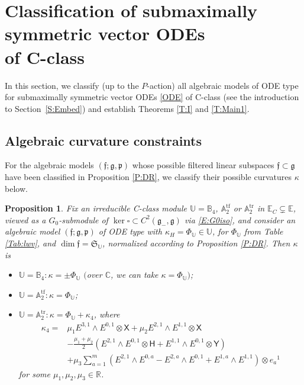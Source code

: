 \documentclass[10pt,a4paper]{amsart}
\newcommand\tensor{\otimes}
\DeclareMathOperator{\tf}{tf}
\DeclareMathOperator{\tr}{tr}
\newcommand{\g}{\mathfrak{g}}
\newcommand\ff{\mathfrak{f}}
\newcommand\fg{\mathfrak{g}}
\newcommand\fp{\mathfrak{p}}
\newcommand\fS{\mathfrak{S}}
\newcommand{\R}{\mathbb{R}}
\newcommand{\C}{\mathbb{C}}
\newcommand\bbE{\mathbb{E}}
\newcommand\bbU{\mathbb{U}}
\newcommand\bbA{\mathbb{A}}
\newcommand\bbB{\mathbb{B}}
\newcommand\sfX{\mathsf{X}}
\newcommand\sfH{\mathsf{H}}
\newcommand\sfY{\mathsf{Y}}
\numberwithin{equation}{section}
\newtheorem{Proposition}[Theorem]{Proposition}
 { \theoremstyle{definition}
\newtheorem{Definition}[Theorem]{Definition}
\newtheorem{Note}[Theorem]{Note}
\newtheorem{Example}[Theorem]{Example}
\newtheorem{Remark}[Theorem]{Remark} }
\begin{document}
 \section[Classification of submaximally symmetric vector ODEs of C-class]{Classification of submaximally symmetric vector ODEs\\ of C-class}
\label{S:curvature}

In this section, we classify (up to the $P$-action) all algebraic models of ODE type for submaximally symmetric vector ODEs \eqref{ODE} of C-class (see the introduction to Section~\ref{S:Embed}) and establish Theorems \ref{T:I} and \ref{T:Main1}.

\subsection{Algebraic curvature constraints} \label{S:k}

For the algebraic models $(\ff;\g,\fp)$ whose possible filtered linear subspaces $\ff \subset \g$ have been classified in Proposition \ref{P:DR}, we classify their possible curvatures $\kappa$ below.

\begin{Proposition}\label{P:k}
Fix an irreducible C-class module $\bbU = \bbB_4$, $\bbA_2^{\tf}$ or $\bbA_2^{\tr}$ in $\bbE_C \subsetneq \bbE$, viewed as a $G_0$-submodule of $\ker\square \subset C^2(\fg_-,\fg)$ via \eqref{E:G0iso}, and consider an algebraic model $(\ff; \g, \fp)$ of ODE type with $\kappa_H = \Phi_{\bbU} \in \bbU$, for $\Phi_\bbU$ from Table {\rm \ref{Tab:lwv}}, and $\dim \ff = \fS_{\bbU}$, normalized according to Proposition {\rm \ref{P:DR}}. Then $\kappa$ is
\begin{itemize}\itemsep=0pt
\item [$(a)$] $\bbU = \bbB_4\colon \kappa = \pm\Phi_{\bbU}$ $($over $\C$, we can take $\kappa = \Phi_{\bbU})$;
\item[$(b)$] $\bbU = \bbA_2^{\tf}\colon\kappa = \Phi_{\bbU}$;
\item[$(c)$] $\bbU = \bbA_2^{\tr}\colon\kappa = \Phi_{\bbU} + \kappa_4$, where
\begin{align}
\kappa_4 ={}& \mu_1 E^{3,1} \wedge E^{0,1} \tensor \sfX + \mu_2 E^{2,1} \wedge E^{1,1} \tensor \sfX \nonumber \\
& -\frac{\mu_1 + \mu_2}{2} \left( E^{2,1} \wedge E^{0,1} \tensor \sfH + E^{1,1} \wedge E^{0,1} \tensor \sfY \right)\nonumber\\
& + \mu_3\sum_{a=1}^m \left(E^{2,1} \wedge E^{0,a} - E^{2,a} \wedge E^{0,1}+ E^{1,a} \wedge E^{1,1} \right) \tensor e_a{}^1\label{E:kappa4}
\end{align}
for some $\mu_1,\mu_2,\mu_3 \in \R$.
\end{itemize}
\end{Proposition}
\end{document}

